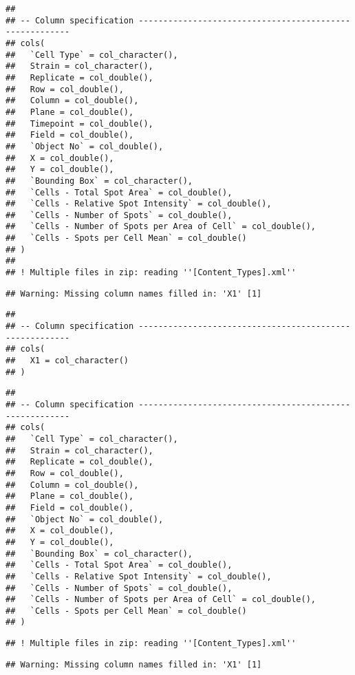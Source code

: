 \documentclass[
]{article}
\begin{document}
\begin{verbatim}
## 
## -- Column specification --------------------------------------------------------
## cols(
##   `Cell Type` = col_character(),
##   Strain = col_character(),
##   Replicate = col_double(),
##   Row = col_double(),
##   Column = col_double(),
##   Plane = col_double(),
##   Timepoint = col_double(),
##   Field = col_double(),
##   `Object No` = col_double(),
##   X = col_double(),
##   Y = col_double(),
##   `Bounding Box` = col_character(),
##   `Cells - Total Spot Area` = col_double(),
##   `Cells - Relative Spot Intensity` = col_double(),
##   `Cells - Number of Spots` = col_double(),
##   `Cells - Number of Spots per Area of Cell` = col_double(),
##   `Cells - Spots per Cell Mean` = col_double()
## )
## 
## ! Multiple files in zip: reading ''[Content_Types].xml''
\end{verbatim}

\begin{verbatim}
## Warning: Missing column names filled in: 'X1' [1]
\end{verbatim}

\begin{verbatim}
## 
## -- Column specification --------------------------------------------------------
## cols(
##   X1 = col_character()
## )
\end{verbatim}

\begin{verbatim}
## 
## -- Column specification --------------------------------------------------------
## cols(
##   `Cell Type` = col_character(),
##   Strain = col_character(),
##   Replicate = col_double(),
##   Row = col_double(),
##   Column = col_double(),
##   Plane = col_double(),
##   Field = col_double(),
##   `Object No` = col_double(),
##   X = col_double(),
##   Y = col_double(),
##   `Bounding Box` = col_character(),
##   `Cells - Total Spot Area` = col_double(),
##   `Cells - Relative Spot Intensity` = col_double(),
##   `Cells - Number of Spots` = col_double(),
##   `Cells - Number of Spots per Area of Cell` = col_double(),
##   `Cells - Spots per Cell Mean` = col_double()
## )
\end{verbatim}

\begin{verbatim}
## ! Multiple files in zip: reading ''[Content_Types].xml''
\end{verbatim}

\begin{verbatim}
## Warning: Missing column names filled in: 'X1' [1]
\end{verbatim}
\end{document}
